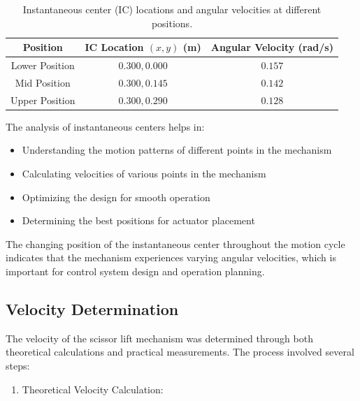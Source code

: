\documentclass[../../main]{subfiles}
\begin{document}
\begin{table}[h!]
  \centering
  \begin{tcolorbox}[
    colback=red!5!white,colframe=red!75!black,
    title={\textbf{(IC) locations and angular velocities}},
    fonttitle=\bfseries, coltitle=white, width=0.85\linewidth]
  \begin{tabular}{|c|c|c|}
      \hline \rowcolor{red!20}
      \textbf{Position} & \textbf{IC Location $(x, y)$ (m)} & \textbf{Angular Velocity (rad/s)} \\ \hline
      Lower Position & $0.300, 0.000$ & $0.157$ \\ \hline
      Mid Position & $0.300, 0.145$ & $0.142$ \\ \hline
      Upper Position & $0.300, 0.290$ & $0.128$ \\ \hline
  \end{tabular}
\end{tcolorbox}
\caption{Instantaneous center (IC) locations and angular velocities at different positions.}
\end{table}
The analysis of instantaneous centers helps in:

\begin{itemize}
\item
  Understanding the motion patterns of different points in the mechanism
\item
  Calculating velocities of various points in the mechanism
\item
  Optimizing the design for smooth operation
\item
  Determining the best positions for actuator placement
\end{itemize}

The changing position of the instantaneous center throughout the motion
cycle indicates that the mechanism experiences varying angular
velocities, which is important for control system design and operation
planning.

\subsection{Velocity Determination}

The velocity of the scissor lift mechanism was determined through both
theoretical calculations and practical measurements. The process
involved several steps:

\begin{enumerate}
\def\labelenumi{\arabic{enumi}.}
\item
  Theoretical Velocity Calculation:
\end{enumerate}
\end{document}
